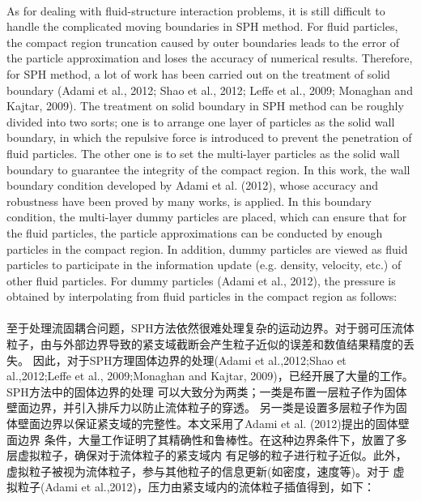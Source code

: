 \documentclass[UTF8]{ctexart}
\begin{document}
{{\paragraph{\quad}As for dealing with fluid-structure interaction problems, it is still 
                difficult to handle the complicated moving boundaries in SPH method. 
                For fluid particles, the compact region truncation caused by outer 
                boundaries leads to the error of the particle approximation and loses 
                the accuracy of numerical results. Therefore, for SPH method, a lot of 
                work has been carried out on the treatment of solid boundary 
                (Adami et al., 2012; Shao et al., 2012; Leffe et al., 2009; Monaghan and Kajtar, 2009). 
                The treatment on solid boundary in SPH method can be roughly divided into two sorts; 
                one is to arrange one layer of particles as the solid wall boundary, in which the 
                repulsive force is introduced to prevent the penetration of fluid particles. The other 
                one is to set the multi-layer particles as the solid wall boundary to guarantee the 
                integrity of the compact region. In this work, the wall boundary condition developed 
                by Adami et al. (2012), whose accuracy and robustness have been proved by many works, 
                is applied. In this boundary condition, the multi-layer dummy particles are placed, which 
                can ensure that for the fluid particles, the particle approximations can be conducted by 
                enough particles in the compact region. In addition, dummy particles are viewed as fluid 
                particles to participate in the information update (e.g. density, velocity, etc.) of other 
                fluid particles. For dummy particles (Adami et al., 2012), the pressure is obtained by 
                interpolating from fluid particles in the compact region as follows:
\paragraph{\quad}至于处理流固耦合问题，SPH方法依然很难处理复杂的运动边界。对于弱可压流体
                粒子，由与外部边界导致的紧支域截断会产生粒子近似的误差和数值结果精度的丢失。
                因此，对于SPH方理固体边界的处理(Adami et al.,2012;Shao et al.,2012;Leffe et al., 
                2009;Monaghan and Kajtar, 2009)，已经开展了大量的工作。SPH方法中的固体边界的处理
                可以大致分为两类；一类是布置一层粒子作为固体壁面边界，并引入排斥力以防止流体粒子的穿透。
                另一类是设置多层粒子作为固体壁面边界以保证紧支域的完整性。本文采用了Adami et al. (2012)提出的固体壁面边界
                条件，大量工作证明了其精确性和鲁棒性。在这种边界条件下，放置了多层虚拟粒子，确保对于流体粒子的紧支域内
                有足够的粒子进行粒子近似。此外，虚拟粒子被视为流体粒子，参与其他粒子的信息更新(如密度，速度等)。对于
                虚拟粒子(Adami et al.,2012)，压力由紧支域内的流体粒子插值得到，如下：

}}
\end{document}
